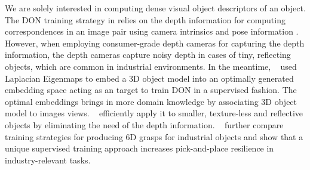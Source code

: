 We are solely interested in computing dense visual object descriptors of an object.
The DON training strategy in \cite{florence2018dense} relies on the depth information for computing correspondences in an image pair using
camera intrinsics and pose information \cite{hartley2003multiple}.
However, when employing consumer-grade depth cameras for capturing the depth information,
the depth cameras capture noisy depth in cases of tiny, reflecting objects, which are common in
industrial environments. In the meantime, \citeauthor{kupcsik2021supervised}~\cite{kupcsik2021supervised} used Laplacian Eigenmaps \cite{belkin2003laplacian}
to embed a 3D object model into an optimally generated embedding space acting as an target to train DON in a supervised fashion.
The optimal embeddings brings in more domain knowledge by associating 3D object model to images views.
\citeauthor{kupcsik2021supervised}~\cite{kupcsik2021supervised} efficiently apply it to smaller, texture-less and
reflective objects by eliminating the need of the depth information. \citeauthor{kupcsik2021supervised}~\cite{kupcsik2021supervised}
further compare training strategies for producing 6D grasps for industrial objects and show that a unique supervised training approach
increases pick-and-place resilience in industry-relevant tasks.

